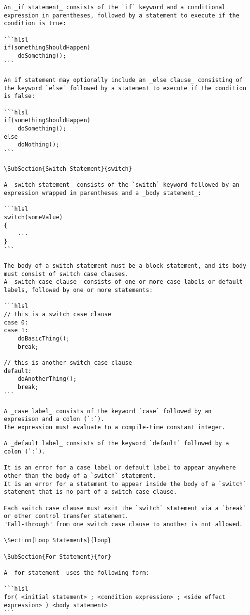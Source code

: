 \begin{verbatim}
An _if statement_ consists of the `if` keyword and a conditional expression in parentheses, followed by a statement to execute if the condition is true:

```hlsl
if(somethingShouldHappen)
    doSomething();
```

An if statement may optionally include an _else clause_ consisting of the keyword `else` followed by a statement to execute if the condition is false:

```hlsl
if(somethingShouldHappen)
 	doSomething();
else
	doNothing();
```

\SubSection{Switch Statement}{switch}

A _switch statement_ consists of the `switch` keyword followed by an expression wrapped in parentheses and a _body statement_:

```hlsl
switch(someValue)
{
	...
}
```

The body of a switch statement must be a block statement, and its body must consist of switch case clauses.
A _switch case clause_ consists of one or more case labels or default labels, followed by one or more statements:

```hlsl
// this is a switch case clause
case 0:
case 1:
    doBasicThing();
    break;

// this is another switch case clause
default:
    doAnotherThing();
    break;
```

A _case label_ consists of the keyword `case` followed by an expresison and a colon (`:`).
The expression must evaluate to a compile-time constant integer.

A _default label_ consists of the keyword `default` followed by a colon (`:`).

It is an error for a case label or default label to appear anywhere other than the body of a `switch` statement.
It is an error for a statement to appear inside the body of a `switch` statement that is no part of a switch case clause.

Each switch case clause must exit the `switch` statement via a `break` or other control transfer statement.
"Fall-through" from one switch case clause to another is not allowed.

\Section{Loop Statements}{loop}

\SubSection{For Statement}{for}

A _for statement_ uses the following form:

```hlsl
for( <initial statement> ; <condition expression> ; <side effect expression> ) <body statement>
```


\end{verbatim}
